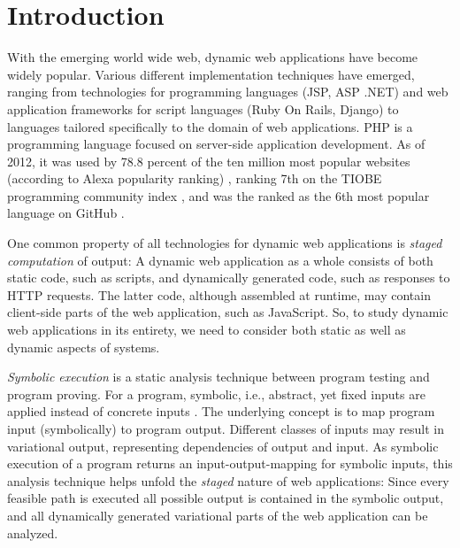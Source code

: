 \documentclass[preprint]{sig-alternate-05-2015}
\begin{document}



%
%
\printccsdesc



\section{Introduction}
With the emerging world wide web, dynamic web applications have become
widely popular. Various different implementation techniques have emerged,
ranging from technologies for programming languages (JSP, ASP .NET) and web
application frameworks for  script languages (Ruby On Rails, Django) to
languages tailored specifically to the domain of web applications. PHP \cite{phpNET} is
a programming language focused on server-side application development. As of 2012,
it was used by 78.8 percent of the ten million most popular websites (according
to Alexa popularity ranking) \cite{alexaPHP}, ranking 7th on the TIOBE
programming community index \cite{tiobePHP}, and was the ranked as the 6th most
popular language on GitHub \cite{githubPHP}.

One common property of all technologies for dynamic web applications is \emph{staged computation} of output: A dynamic web application as a whole consists of both static code, such as scripts, and dynamically generated code, such as responses to HTTP requests. The latter code, although assembled at runtime, may contain client-side parts of the web application, such as JavaScript. So, to study dynamic web applications in its entirety, we need to consider both static as well as dynamic aspects of systems.


\emph{Symbolic execution} is a static analysis technique between program testing
and program proving. For a program, symbolic, i.e., abstract, yet fixed inputs are
applied instead of concrete inputs \cite{Darringer1978,King1976}. The underlying
concept is to map program input (symbolically) to program output. Different classes of inputs may
result in variational output, representing dependencies of output and input.
As symbolic execution of a program returns an input-output-mapping for symbolic inputs, this analysis technique helps unfold the \emph{staged} nature of web applications: Since every feasible path is executed all possible output is contained in the symbolic output, and all dynamically generated variational parts of the web application can be analyzed.
\end{document}

